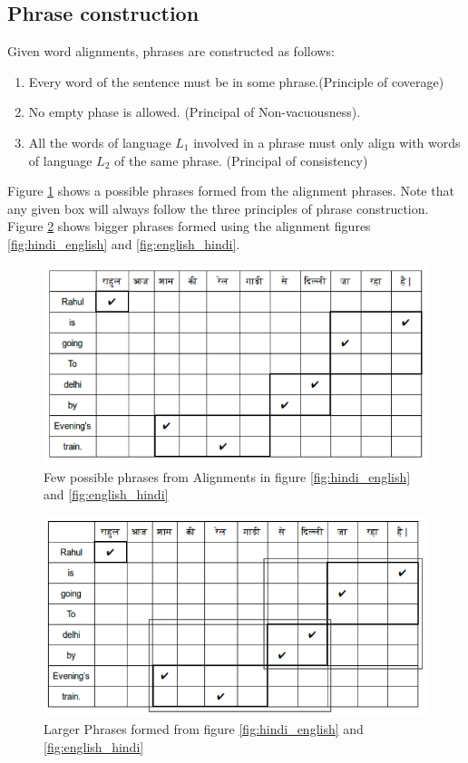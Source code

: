 \subsection{Phrase construction}
Given word alignments, phrases are constructed as follows\cite{bhattacharyya,koehn}:
\begin{enumerate}
\item Every word of the sentence must be in some phrase.(Principle of coverage)
\item No empty phase is allowed. (Principal of Non-vacuousness).
\item All the words of language $L_{1}$ involved in a phrase must only align with words of language $L_{2}$ of the same phrase. (Principal of consistency)
\end{enumerate}
Figure \ref{fig:boxed} shows a possible phrases formed from the alignment phrases. Note that any given box will always follow the three principles of phrase construction. Figure \ref{fig:boxed_complete} shows bigger phrases formed using the  alignment figures \ref{fig:hindi_english} and \ref{fig:english_hindi}.
\begin{figure}[H]
        \centering
        \includegraphics[scale=0.4]{Images/boxed.png}
        \caption{Few possible phrases from Alignments in figure \ref{fig:hindi_english} and \ref{fig:english_hindi}}
        \label{fig:boxed}
\end{figure}
\begin{figure}[H]
        \centering
        \includegraphics[scale=0.4]{Images/boxed_complete.png}
        \caption{Larger Phrases formed from figure \ref{fig:hindi_english} and \ref{fig:english_hindi}}
        \label{fig:boxed_complete}
\end{figure}

